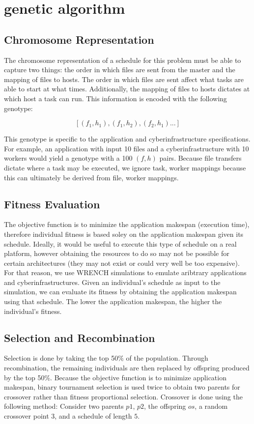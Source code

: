 \section{genetic algorithm}
\label{sec:genetic_algorithm}

\subsection*{Chromosome Representation}
The chromosome representation of a schedule for this problem must be able to
capture two things: the order in which files are sent from the master and
the mapping of files to hosts. The order in which files are sent affect what
tasks are able to start at what times. Additionally, the mapping of files to
hosts dictates at which host a task can run. This information is encoded
with the following genotype:

$$[(f_1, h_1),(f_1,h_2),(f_2,h_1)...]$$

This genotype is specific to the application and cyberinfrastructure specifications.
For example, an application with input 10 files and a cyberinfrastructure with 10 workers
would yield a genotype with a 100 $(f,h)$ pairs. Because file transfers dictate
where a task may be executed, we ignore task, worker mappings because this can
ultimately be derived from file, worker mappings.

\subsection*{Fitness Evaluation}
The objective function is to minimize the application makespan (execution time),
therefore individual fitness is based soley on the application makespan given
its schedule. Ideally, it would be useful to execute this type of schedule
on a real platform, however obtaining the resources to do so may not be
possible for certain architectures (they may not exist or could very well be
too expensive). For that reason, we use WRENCH simulations to emulate aribtrary
applications and cyberinfrastructures. Given an individual's schedule as input
to the simulation, we can evaluate its fitness by obtaining the application
makespan using that schedule. The lower the application makespan, the higher
the individual's fitness.

\subsection*{Selection and Recombination}
Selection is done by taking the top 50\% of the population. Through recombination,
the remaining individuals are then replaced by offspring produced by the
top 50\%. Because the objective function is to minimize application makespan,
binary tournament selection is used twice to obtain two parents for crossover rather
than fitness proportional selection. Crossover is done using the following method:
Consider two parents $p1$, $p2$, the offspring $os$, a random crossover point $3$, and a schedule of
length $5$.

